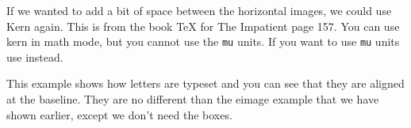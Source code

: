 \begin{macro}{\kern}
If we wanted to add a bit of space between the horizontal images, we could use 
Kern again. This is from the book TeX for The Impatient page 157. You can use kern in math mode, but you cannot use the \texttt{mu} units. If you want to use \texttt{mu} units use  instead.
\end{macro}

\begin{texexample}{}{}
   \fboxsep=0pt
\end{texexample}

\begin{texexample}{}{}
   \HHUGE
   \fboxsep=0pt
\end{texexample}

This example shows how letters are typeset and you can see that they are aligned at the baseline. They are no different than the eimage example that we have shown earlier, except we don't need the boxes.

\medskip

